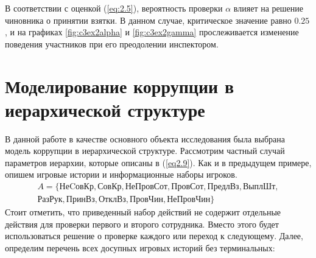 \par
В соответствии с оценкой (\ref{eq:2.5}), вероятность проверки $\alpha$ влияет на решение чиновника о принятии взятки. В данном случае, критическое значение равно $0.25$, и на графиках \ref{fig:c3ex2alpha} и \ref{fig:c3ex2gamma} прослеживается изменение поведения участников при его преодолении инспектором.
\section{Моделирование коррупции в иерархической структуре}

В данной работе в качестве основного объекта исследования была выбрана модель коррупции в иерархической структуре. Рассмотрим частный случай параметров иерархии, которые описаны в (\ref{eq2.9}). Как и в предыдущем примере, опишем игровые истории и информационные наборы игроков.
\begin{align*}
	A = \{\text{НеCовКр}, \text{СовКр}, \text{НеПровСот}, \text{ПровСот}, \text{ПредлВз}, \text{ВыплШт},\\ \text{РазРук}, \text{ПринВз}, \text{ОтклВз}, \text{ПровЧин}, \text{НеПровЧин} \}
\end{align*}
Стоит отметить, что приведенный набор действий не содержит отдельные действия для проверки первого и второго сотрудника. Вместо этого будет использоваться решение о проверке каждого или переход к следующему.
Далее, определим перечень всех досупных игровых историй без терминальных:

